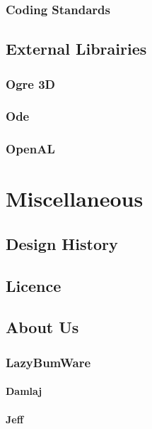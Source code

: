 \documentclass[a4paper]{report}
\begin{document}
		\section{Coding Standards}

	\chapter{External Librairies}

		\section{Ogre 3D}

		\section{Ode}

		\section{OpenAL}

\part{Miscellaneous}

	\chapter{Design History}

	\chapter{Licence}

	\chapter{About Us}

		\section{LazyBumWare}

			\subsection{Damlaj}

			\subsection{Jeff}
\end{document}
